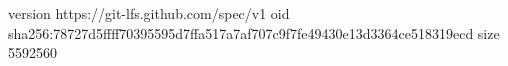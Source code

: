 version https://git-lfs.github.com/spec/v1
oid sha256:78727d5ffff70395595d7ffa517a7af707c9f7fe49430e13d3364ce518319ecd
size 5592560
